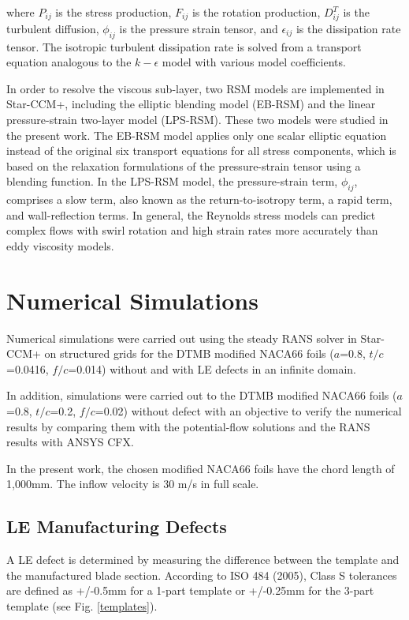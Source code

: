 \documentclass[onecolumn,11pt]{report}
\begin{document}
where $P_{ij}$ is the stress production, $F_{ij}$ is the rotation production, $D_{ij}^T$ is the turbulent diffusion, $\phi_{ij}$ is the pressure strain tensor, and $\epsilon_{ij}$ is the dissipation rate tensor. The isotropic turbulent dissipation rate is solved from a transport equation analogous to the $k-\epsilon$ model with various model coefficients. 

In order to resolve the viscous sub-layer, two RSM models are implemented in Star-CCM+, including the elliptic blending model (EB-RSM) and the linear pressure-strain two-layer model (LPS-RSM). These two models were studied in the present work. The EB-RSM model applies only one scalar elliptic equation instead of the original six transport equations for all stress components, which is based on the relaxation formulations of the pressure-strain tensor using a blending function. In the LPS-RSM model, the pressure-strain term, $\phi_{ij}$,  comprises a slow term, also known as the return-to-isotropy term, a rapid term, and wall-reflection terms. In general, the Reynolds stress models can predict complex flows with swirl rotation and high strain rates more accurately than eddy viscosity models. 
 

\chapter{Numerical Simulations}

Numerical simulations were carried out using the steady RANS solver in Star-CCM+ on structured grids for the DTMB modified NACA66 foils ($a$=0.8, $t/c$=0.0416, $f/c$=0.014) without and with LE defects in an infinite domain.  

In addition, simulations were carried out to the DTMB modified NACA66 foils ($a$=0.8, $t/c$=0.2, $f/c$=0.02) without defect with an objective to verify the numerical results by comparing them with the potential-flow solutions and the RANS results with ANSYS CFX.  

In the present work, the chosen modified NACA66 foils have the chord length of 1,000mm. The inflow velocity is 30 m/s in full scale.

\section{LE Manufacturing Defects}

A LE defect is determined by measuring the difference between the template and the manufactured blade section. According to ISO 484 (2005), Class S tolerances are defined as +/-0.5mm for a 1-part template or +/-0.25mm for the 3-part template (see Fig. \ref{templates}). 
\end{document}
